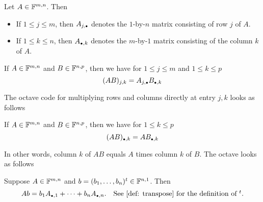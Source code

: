 \begin{mydef}  Let $A\in \mathbb{F}^{m,n}$. Then
  \begin{itemize}
    \item If $1 \leq j \leq m$, then $A_{j, \mathsmaller{\bullet}}$ denotes the $1$-by-$n$ matrix consisting of row $j$ of $A$.
    \item If $1 \leq k \leq n$, then  $A_{\mathsmaller{\bullet}, k}$ denotes the $m$-by-$1$ matrix consisting of the column $k$ of $A$.
  \end{itemize}
\end{mydef}

\setcounter{thm}{45}
\begin{thm} 
  If $A \in \mathbb{F}^{m,n}$ and $B \in \mathbb{F}^{n,p}$, then we have for $1 \leq j \leq m$ and $1 \leq k \leq p$
  \begin{equation}
    (AB)_{j,k} = A_{j, \mathsmaller{\bullet}} B_{\mathsmaller{\bullet}, k}
  \end{equation}

  \begin{minipage}{\linewidth}
    The octave code for multiplying rows and columns directly at entry $j,k$ looks as follows

  \end{minipage}
\end{thm}

\setcounter{thm}{47}
\begin{thm}
  If $A \in \mathbb{F}^{m,n}$ and $B \in \mathbb{F}^{n,p}$, then we have for $1 \leq k \leq p$
  \begin{equation}
    (AB)_{\mathsmaller{\bullet}, k} = AB_{\mathsmaller{\bullet}, k}
  \end{equation}

  In other words, column $k$ of $AB$ equals $A$ times column $k$ of $B$. The octave looks as follows


\end{thm}

\setcounter{thm}{49}
\begin{thm}
  Suppose $A \in \mathbb{F}^{m,n}$ and  $b = (b_1, \ldots, b_n)^{t}\in \mathbb{F}^{n,1}$. Then
  \begin{equation}
    Ab = b_1 A_{\mathsmaller{\bullet}, 1} + \dots + b_n A_{\mathsmaller{\bullet},n}. \quad $See \ref{def: transpose} for the definition of $^t.
  \end{equation}
\end{thm}

